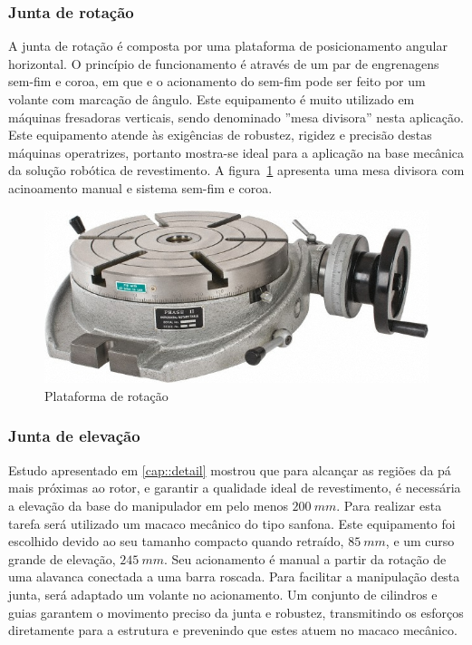 \subsubsection{Junta de rotação}

A junta de rotação é composta por uma plataforma de posicionamento angular
horizontal.
O princípio de funcionamento é através de um par de engrenagens sem-fim e coroa,
em que e o acionamento do sem-fim pode ser feito por um volante com marcação de
ângulo. Este equipamento é muito utilizado em máquinas fresadoras verticais,
sendo denominado ''mesa divisora'' nesta aplicação.
Este equipamento atende às exigências de robustez, rigidez e precisão destas
máquinas operatrizes, portanto mostra-se ideal para a aplicação na base mecânica
da solução robótica de revestimento. A figura~\ref{fig::rotary_table} apresenta
uma mesa divisora com acinoamento manual e sistema sem-fim e coroa.

\begin{figure}[h!]
	\centering
	\includegraphics[width=0.6\columnwidth]{method/figs/construcao/rotary_table}
	\caption{Plataforma de rotação}
    \label{fig::rotary_table}
\end{figure}

\subsubsection{Junta de elevação}

Estudo apresentado em \ref{cap::detail} mostrou que para alcançar as regiões da
pá mais próximas ao rotor, e garantir a qualidade ideal de revestimento, é
necessária a elevação da base do manipulador em pelo menos $200~mm$.
Para realizar esta tarefa será utilizado um macaco mecânico do tipo sanfona.
Este equipamento foi escolhido devido ao seu tamanho compacto quando retraído,
$85~mm$, e um curso grande de elevação, $245~mm$. Seu acionamento é manual a
partir da rotação de uma alavanca conectada a uma barra roscada.
Para facilitar a manipulação desta junta, será adaptado um volante no
acionamento.
Um conjunto de cilindros e guias garantem o movimento preciso da junta e
robustez, transmitindo os esforços diretamente para a estrutura e prevenindo que
estes atuem no macaco mecânico.

